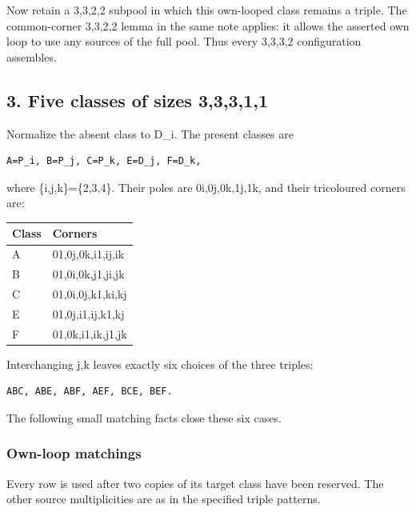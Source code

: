 \documentclass[
  10pt,
]{article}
\begin{document}
Now retain a 3,3,2,2 subpool in which this own-looped class remains a
triple. The common-corner 3,3,2,2 lemma in the same note applies: it
allows the asserted own loop to use any sources of the full pool. Thus
every 3,3,3,2 configuration assembles.

\hypertarget{five-classes-of-sizes-33311}{%
\subsection*{3. Five classes of sizes
3,3,3,1,1}\label{five-classes-of-sizes-33311}}

Normalize the absent class to D\_i. The present classes are

\begin{verbatim}
A=P_i, B=P_j, C=P_k, E=D_j, F=D_k,
\end{verbatim}

where \{i,j,k\}=\{2,3,4\}. Their poles are 0i,0j,0k,1j,1k, and their
tricoloured corners are:

\begin{longtable}[]{@{}ll@{}}
\toprule\noalign{}
Class & Corners \\
\midrule\noalign{}
\endhead
\bottomrule\noalign{}
\endlastfoot
A & 01,0j,0k,i1,ij,ik \\
B & 01,0i,0k,j1,ji,jk \\
C & 01,0i,0j,k1,ki,kj \\
E & 01,0j,i1,ij,k1,kj \\
F & 01,0k,i1,ik,j1,jk \\
\end{longtable}

Interchanging j,k leaves exactly six choices of the three triples:

\begin{verbatim}
ABC, ABE, ABF, AEF, BCE, BEF.
\end{verbatim}

The following small matching facts close these six cases.

\hypertarget{own-loop-matchings}{%
\subsubsection*{Own-loop matchings}\label{own-loop-matchings}}

Every row is used after two copies of its target class have been
reserved. The other source multiplicities are as in the specified triple
patterns.
\end{document}

